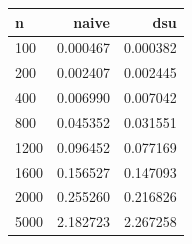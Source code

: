 \begin{tabular}{lrr}
\hline
n & naive & dsu \\
\hline
100 & 0.000467 & 0.000382 \\
200 & 0.002407 & 0.002445 \\
400 & 0.006990 & 0.007042 \\
800 & 0.045352 & 0.031551 \\
1200 & 0.096452 & 0.077169 \\
1600 & 0.156527 & 0.147093 \\
2000 & 0.255260 & 0.216826 \\
5000 & 2.182723 & 2.267258 \\
\hline
\end{tabular}

